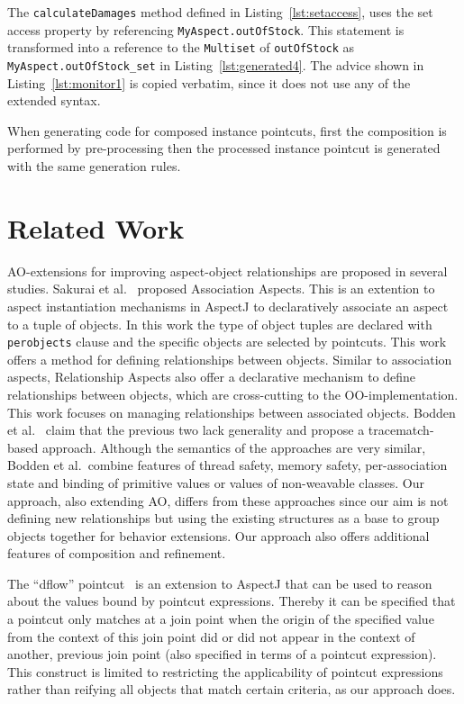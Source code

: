 \documentclass{llncs}
\begin{document}
The \texttt{calculateDamages} method defined in Listing~\ref{lst:setaccess}, uses the set access property by referencing \texttt{MyAspect.outOfStock}. This statement is transformed into a reference to the \texttt{Multiset} of \texttt{outOfStock} as \texttt{MyAspect.outOfStock_set} in Listing~\ref{lst:generated4}. The advice shown in Listing~\ref{lst:monitor1} is copied verbatim, since it does not use any of the extended syntax.

When generating code for composed instance pointcuts, first the composition is performed by pre-processing then the processed instance pointcut is generated with the same generation rules. 

\section{Related Work}
AO-extensions for improving aspect-object relationships are proposed in several studies. Sakurai et al.~\cite{sakurai2004association} proposed Association Aspects. This is an extention to aspect instantiation mechanisms in AspectJ to declaratively associate an aspect to a tuple of objects. In this work the type of object tuples are declared with \texttt{perobjects} clause and the specific objects are selected by pointcuts. This work offers a method for defining relationships between objects. Similar to association aspects, Relationship Aspects \cite{pearce2006relationship} also offer a declarative mechanism to define relationships between objects, which are cross-cutting to the OO-implementation. This work focuses on managing relationships between associated objects. Bodden et al.~ \cite{bodden2008relational} claim that the previous two lack generality and propose a tracematch-based approach. Although the semantics of the approaches are very similar, Bodden et al.\ combine features of thread safety, memory safety, per-association state and binding of primitive values or values of non-weavable classes. Our approach, also extending AO, differs from these approaches since our aim is not defining new relationships but using the existing structures as a base to group objects together for behavior extensions. Our approach also offers additional features of composition and refinement.

The ``dflow'' pointcut~\cite{kawauchi:aosd-aosdsec04} is an extension to AspectJ that can be used to reason about the values bound by pointcut expressions. Thereby it can be specified that a pointcut only matches at a join point when the origin of the specified value from the context of this join point did or did not appear in the context of another, previous join point (also specified in terms of a pointcut expression). This construct is limited to restricting the applicability of pointcut expressions rather than reifying all objects that match certain criteria, as our approach does.
\end{document}
